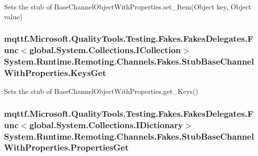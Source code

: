 Sets the stub of Base\-Channel\-Object\-With\-Properties.\-set\-\_\-\-Item(\-Object key, Object value)

\hypertarget{class_system_1_1_runtime_1_1_remoting_1_1_channels_1_1_fakes_1_1_stub_base_channel_with_properties_a01a51980255c73d61df297fcbff94f1a}{
\subsubsection[{Keys\-Get}]{\setlength{\rightskip}{0pt plus 5cm}mqttf.\-Microsoft.\-Quality\-Tools.\-Testing.\-Fakes.\-Fakes\-Delegates.\-Func$<$global.\-System.\-Collections.\-I\-Collection$>$ System.\-Runtime.\-Remoting.\-Channels.\-Fakes.\-Stub\-Base\-Channel\-With\-Properties.\-Keys\-Get}}\label{class_system_1_1_runtime_1_1_remoting_1_1_channels_1_1_fakes_1_1_stub_base_channel_with_properties_a01a51980255c73d61df297fcbff94f1a}


Sets the stub of Base\-Channel\-Object\-With\-Properties.\-get\-\_\-\-Keys()

\hypertarget{class_system_1_1_runtime_1_1_remoting_1_1_channels_1_1_fakes_1_1_stub_base_channel_with_properties_a81e28c05b3bd0e7a096f334972494441}{
\subsubsection[{Properties\-Get}]{\setlength{\rightskip}{0pt plus 5cm}mqttf.\-Microsoft.\-Quality\-Tools.\-Testing.\-Fakes.\-Fakes\-Delegates.\-Func$<$global.\-System.\-Collections.\-I\-Dictionary$>$ System.\-Runtime.\-Remoting.\-Channels.\-Fakes.\-Stub\-Base\-Channel\-With\-Properties.\-Properties\-Get}}\label{class_system_1_1_runtime_1_1_remoting_1_1_channels_1_1_fakes_1_1_stub_base_channel_with_properties_a81e28c05b3bd0e7a096f334972494441}


